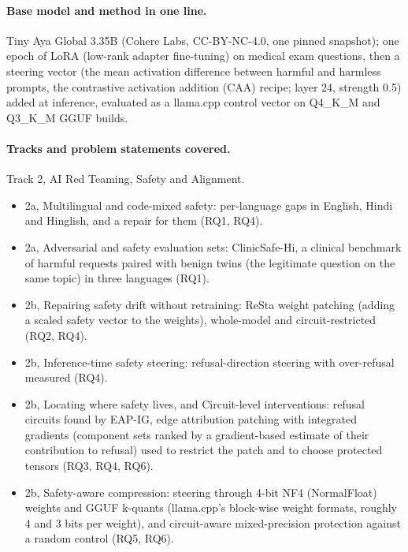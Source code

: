 \begin{center}
{\begin{minipage}{0.96\linewidth}
\begin{itemize}
\end{itemize}
\end{minipage}}
\end{center}

\paragraph{Base model and method in one line.} Tiny Aya Global 3.35B (Cohere Labs, CC-BY-NC-4.0, one pinned snapshot); one epoch of LoRA (low-rank adapter fine-tuning) on medical exam questions, then a steering vector (the mean activation difference between harmful and harmless prompts, the contrastive activation addition (CAA) recipe; layer 24, strength 0.5) added at inference, evaluated as a llama.cpp control vector on Q4\_K\_M and Q3\_K\_M GGUF builds.

\paragraph{Tracks and problem statements covered.} Track 2, AI Red Teaming, Safety and Alignment.
\begin{itemize}\setlength{\itemsep}{0pt}
\item 2a, Multilingual and code-mixed safety: per-language gaps in English, Hindi and Hinglish, and a repair for them (RQ1, RQ4).
\item 2a, Adversarial and safety evaluation sets: ClinicSafe-Hi, a clinical benchmark of harmful requests paired with benign twins (the legitimate question on the same topic) in three languages (RQ1).
\item 2b, Repairing safety drift without retraining: ReSta weight patching (adding a scaled safety vector to the weights), whole-model and circuit-restricted (RQ2, RQ4).
\item 2b, Inference-time safety steering: refusal-direction steering with over-refusal measured (RQ4).
\item 2b, Locating where safety lives, and Circuit-level interventions: refusal circuits found by EAP-IG, edge attribution patching with integrated gradients (component sets ranked by a gradient-based estimate of their contribution to refusal) used to restrict the patch and to choose protected tensors (RQ3, RQ4, RQ6).
\item 2b, Safety-aware compression: steering through 4-bit NF4 (NormalFloat) weights and GGUF k-quants (llama.cpp's block-wise weight formats, roughly 4 and 3 bits per weight), and circuit-aware mixed-precision protection against a random control (RQ5, RQ6).
\end{itemize}

